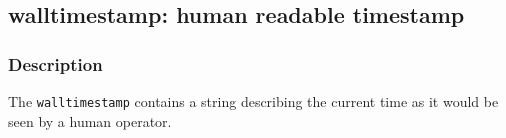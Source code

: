 \clearpage
{}
{}
\label{vars:walltimestamp}
\subsection*{walltimestamp: human readable timestamp}

\subsubsection*{Description}

The \verb|walltimestamp| contains a string describing the current time
as it would be seen by a human operator.

